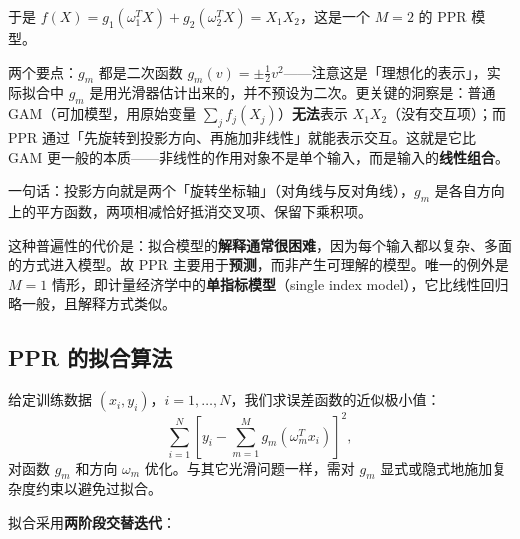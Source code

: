 于是 $f(X) = g_1(\omega_1^T X) + g_2(\omega_2^T X) = X_1X_2$，这是一个 $M=2$ 的 PPR 模型。

两个要点：$g_m$ 都是二次函数 $g_m(v) = \pm\frac12 v^2$——注意这是「理想化的表示」，实际拟合中 $g_m$ 是用光滑器估计出来的，并不预设为二次。更关键的洞察是：普通 GAM（可加模型，用原始变量 $\sum_j f_j(X_j)$）\textbf{无法}表示 $X_1X_2$（没有交互项）；而 PPR 通过「先旋转到投影方向、再施加非线性」就能表示交互。这就是它比 GAM 更一般的本质——非线性的作用对象不是单个输入，而是输入的\textbf{线性组合}。

一句话：投影方向就是两个「旋转坐标轴」（对角线与反对角线），$g_m$ 是各自方向上的平方函数，两项相减恰好抵消交叉项、保留下乘积项。

\begin{remark}[代价：可解释性差]
这种普遍性的代价是：拟合模型的\textbf{解释通常很困难}，因为每个输入都以复杂、多面的方式进入模型。故 PPR 主要用于\textbf{预测}，而非产生可理解的模型。唯一的例外是 $M=1$ 情形，即计量经济学中的\textbf{单指标模型}（single index model），它比线性回归略一般，且解释方式类似。
\end{remark}

\subsection{PPR 的拟合算法}

给定训练数据 $(x_i, y_i)$，$i=1,\dots,N$，我们求误差函数的近似极小值：
\begin{equation}
\sum_{i=1}^{N} \left[ y_i - \sum_{m=1}^{M} g_m(\omega_m^T x_i) \right]^2, \label{eq:11_2}
\end{equation}
对函数 $g_m$ 和方向 $\omega_m$ 优化。与其它光滑问题一样，需对 $g_m$ 显式或隐式地施加复杂度约束以避免过拟合。

拟合采用\textbf{两阶段交替迭代}：

